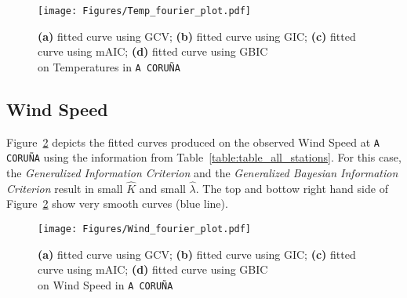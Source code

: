 \begin{figure}[th]
    \texttt{[image: Figures/Temp\_fourier\_plot.pdf]}
  \caption[Fitting Temperature with \textit{Fourier basis function} on \texttt{A CORUÑA} station]{\textbf{(a)} fitted curve using GCV; \textbf{(b)} fitted curve using GIC; \textbf{(c)} fitted curve using mAIC; \textbf{(d)} fitted curve using GBIC \\ on Temperatures in \texttt{A CORUÑA} }
  \label{fig:Temp_fourier}
\end{figure}
\clearpage
\subsection{Wind Speed}
Figure~\ref{fig:Wind_fourier_plot} depicts the fitted curves produced on the observed Wind Speed at \texttt{A CORUÑA} using the information from Table~\ref{table:table_all_stations}. For this case, the \textit{Generalized Information Criterion} and the \textit{Generalized Bayesian Information Criterion} result in small $\hat{K}$ and small $\hat{\lambda}$. The top and bottow right hand side of Figure~\ref{fig:Wind_fourier_plot} show very smooth curves (blue line).
\begin{figure}[th]
    \texttt{[image: Figures/Wind\_fourier\_plot.pdf]}
  \caption[Fitting Wind Speed with \textit{Fourier basis function} on \texttt{A CORUÑA} station]{\textbf{(a)} fitted curve using GCV; \textbf{(b)} fitted curve using GIC; \textbf{(c)} fitted curve using mAIC; \textbf{(d)} fitted curve using GBIC \\ on Wind Speed in \texttt{A CORUÑA}}
  \label{fig:Wind_fourier_plot}
\end{figure}
\clearpage
